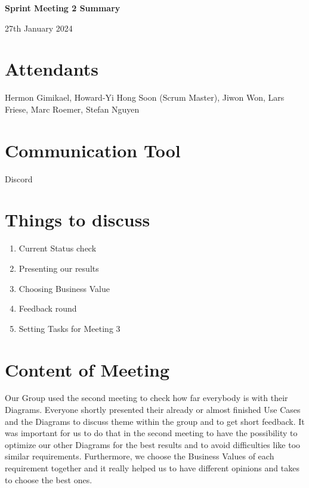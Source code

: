 \documentclass{article}
\begin{document}

\begin{center}
    {\Large \textbf{Sprint Meeting 2 Summary}}
    
    \vspace{0.5cm}
    
    {\large 27th January 2024}
\end{center}

\section*{Attendants}
Hermon Gimikael, Howard-Yi Hong Soon (Scrum Master), Jiwon Won, Lars Friese, Marc Roemer, Stefan Nguyen

\section*{Communication Tool}
Discord

\section*{Things to discuss}
\begin{enumerate}
    \item Current Status check
    \item Presenting our results
    \item Choosing Business Value 
    \item Feedback round
    \item Setting Tasks for Meeting 3
\end{enumerate}

\section*{Content of Meeting}
Our Group used the second meeting to check how far everybody is with their Diagrams. Everyone shortly presented their already or almost finished Use Cases and the Diagrams to discuss theme within the group and to get short feedback. It was important for us to do that in the second meeting to have the possibility to optimize our other Diagrams for the best results and to avoid difficulties like too similar requirements. Furthermore, we choose the Business Values of each requirement together and it really helped us to have different opinions and takes to choose the best ones. 
\end{document}
